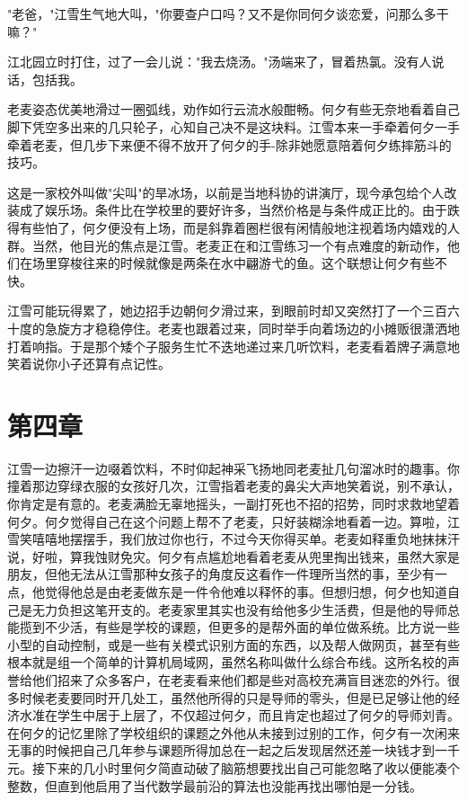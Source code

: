 \documentclass[UTF8]{ctexart}
\begin{document}
"老爸，"江雪生气地大叫，"你要查户口吗？又不是你同何夕谈恋爱，问那么多干嘛？"

江北园立时打住，过了一会儿说："我去烧汤。"汤端来了，冒着热氯。没有人说话，包括我。

老麦姿态优美地滑过一圈弧线，劝作如行云流水般酣畅。何夕有些无奈地看着自己脚下凭空多出来的几只轮子，心知自己决不是这块料。江雪本来一手牵着何夕一手牵着老麦，但几步下来便不得不放开了何夕的手-除非她愿意陪着何夕练摔筋斗的技巧。

这是一家校外叫做"尖叫"的旱冰场，以前是当地科协的讲演厅，现今承包给个人改装成了娱乐场。条件比在学校里的要好许多，当然价格是与条件成正比的。由于跌得有些怕了，何夕便没有上场，而是斜靠着圈栏很有闲情般地注视着场内嬉戏的人群。当然，他目光的焦点是江雪。老麦正在和江雪练习一个有点难度的新动作，他们在场里穿梭往来的时候就像是两条在水中翩游弋的鱼。这个联想让何夕有些不快。

江雪可能玩得累了，她边招手边朝何夕滑过来，到眼前时却又突然打了一个三百六十度的急旋方才稳稳停住。老麦也跟着过来，同时举手向着场边的小摊贩很潇洒地打着响指。于是那个矮个子服务生忙不迭地递过来几听饮料，老麦看着牌子满意地笑着说你小子还算有点记性。
\clearpage

\section*{第四章}
江雪一边擦汗一边啜着饮料，不时仰起神采飞扬地同老麦扯几句溜冰时的趣事。你撞着那边穿绿衣服的女孩好几次，江雪指着老麦的鼻尖大声地笑着说，别不承认，你肯定是有意的。老麦满脸无辜地摇头，一副打死也不招的招势，同时求救地望着何夕。何夕觉得自己在这个问题上帮不了老麦，只好装糊涂地看着一边。算啦，江雪笑嘻嘻地摆摆手，我们放过你也行，不过今天你得买单。老麦如释重负地抹抹汗说，好啦，算我蚀财免灾。何夕有点尴尬地看着老麦从兜里掏出钱来，虽然大家是朋友，但他无法从江雪那种女孩子的角度反这看作一件理所当然的事，至少有一点，他觉得他总是由老麦做东是一件令他难以释怀的事。但想归想，何夕也知道自己是无力负担这笔开支的。老麦家里其实也没有给他多少生活费，但是他的导师总能揽到不少活，有些是学校的课题，但更多的是帮外面的单位做系统。比方说一些小型的自动控制，或是一些有关模式识别方面的东西，以及帮人做网页，甚至有些根本就是组一个简单的计算机局域网，虽然名称叫做什么综合布线。这所名校的声誉给他们招来了众多客户，在老麦看来他们都是些对高校充满盲目迷恋的外行。很多时候老麦要同时开几处工，虽然他所得的只是导师的零头，但是已足够让他的经济水准在学生中居于上层了，不仅超过何夕，而且肯定也超过了何夕的导师刘青。在何夕的记忆里除了学校组织的课题之外他从未接到过别的工作，何夕有一次闲来无事的时候把自己几年参与课题所得加总在一起之后发现居然还差一块钱才到一千元。接下来的几小时里何夕简直动破了脑筋想要找出自己可能忽略了收以便能凑个整数，但直到他启用了当代数学最前沿的算法也没能再找出哪怕是一分钱。
\end{document}
